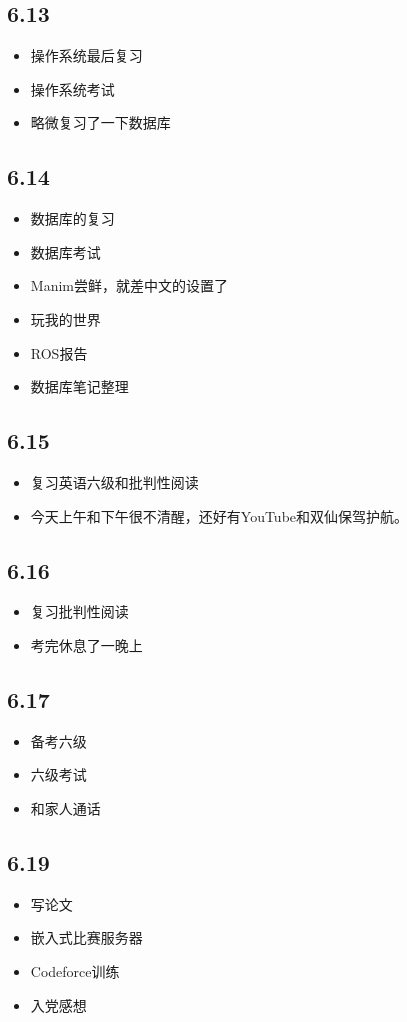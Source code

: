 \documentclass[UTF8]{ctexart}
\begin{document}
\subsection*{6.13}
\begin{itemize}
    \item 操作系统最后复习
    \item 操作系统考试
    \item 略微复习了一下数据库
\end{itemize}
\subsection*{6.14}
\begin{itemize}
    \item 数据库的复习
    \item 数据库考试
    \item Manim尝鲜，就差中文的设置了
    \item 玩我的世界
    \item ROS报告
    \item 数据库笔记整理
\end{itemize}
\subsection*{6.15}
\begin{itemize}
    \item 复习英语六级和批判性阅读
    \item 今天上午和下午很不清醒，还好有YouTube和双仙保驾护航。
\end{itemize}
\subsection*{6.16}
\begin{itemize}
    \item 复习批判性阅读
    \item 考完休息了一晚上
\end{itemize}
\subsection*{6.17}
\begin{itemize}
    \item 备考六级
    \item 六级考试
    \item 和家人通话
\end{itemize}
\subsection*{6.19}
\begin{itemize}
    \item 写论文
    \item 嵌入式比赛服务器
    \item Codeforce训练
    \item 入党感想
\end{itemize}
\end{document}
